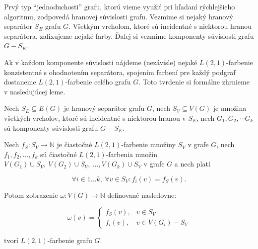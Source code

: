 Prvý typ ``jednoduchosti'' grafu, ktorú vieme využiť pri hľadaní rýchlejšieho algoritmu,
zodpovedá hranovej súvislosti grafu. Vezmime si nejaký hranový separátor $S_E$ grafu $G$. 
Všetkým vrcholom, ktoré sú incidentné s niektorou hranou separátora, zafixujeme nejaké farby.
Ďalej si vezmime komponenty súvislosti grafu $G - S_E$.

Ak v každom komponente súvislosti nájdeme (nezávisle) nejaké $L(2,1)$-farbenie
konzistentné s ohodnotením separátora, spojením farbení pre každý podgraf dostaneme
$L(2,1)$-farbenie celého grafu $G$. Toto tvrdenie si formálne zhrnieme v nasledujúcej leme.

\begin{lema}
\label{hrsep-lema}
    Nech $S_E \subseteq E(G)$ je hranový separátor grafu $G$,
    nech $S_V \subseteq V(G)$ je množina všetkých vrcholov, ktoré sú incidentné s niektorou hranou
    v $S_E$, nech $G_1, G_2, \cdots G_k$ sú komponenty súvislosti grafu $G - S_E$.

    Nech $f_S: S_V \to \mathbb{N}$ je čiastočné $L(2,1)$-farbenie množiny $S_V$ v grafe $G$,
    nech $f_1, f_2, \ldots, f_k$ sú čiastočné $L(2,1)$-farbenia množín $V(G_1) \cup S_V,\ 
    V(G_2) \cup S_V,\  \ldots, V(G_k) \cup S_V$ v grafe $G$ a nech platí

    $$ \forall i \in {1 \ldots k},\  \forall v \in S_V: f_i(v) = f_S(v) .$$

    Potom zobrazenie $\omega: V(G) \to \mathbb{N}$ definované nasledovne:

    \[ \omega(v) =
    \begin{cases}
        f_S(v), & v \in S_V \\
        f_i(v), & v \in V(G_i) - S_V
    \end{cases}
    \]

    tvorí $L(2,1)$-farbenie grafu $G$.

\end{lema}

